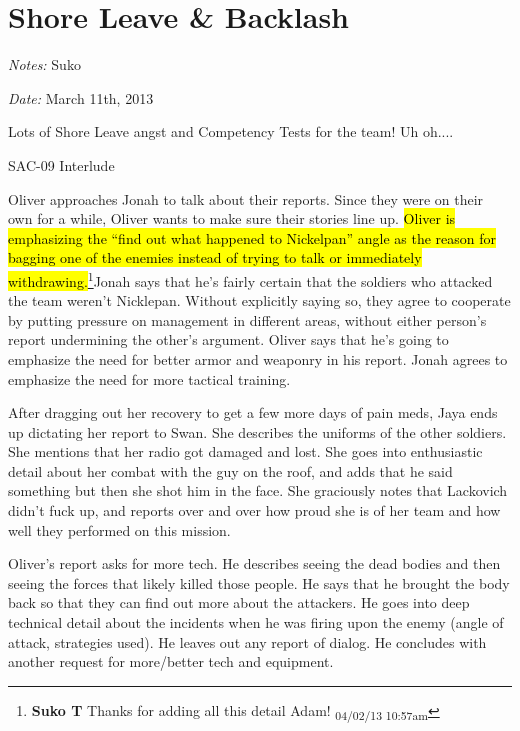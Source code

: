 \setcounter{chapter}{ 16 }
\chapter{\textbf{Shore Leave \& Backlash} }






\textit{Notes:} Suko

\textit{Date:} March 11th, 2013



Lots of Shore Leave angst and Competency Tests for the team!  Uh oh....



\noindent\hrulefill





 {\LARGE SAC-09 Interlude } 



Oliver approaches Jonah to talk about their reports.  Since they were on their own for a while, Oliver wants to make sure their stories line up.  \hl{Oliver is emphasizing the ``find out what happened to Nickelpan'' angle as the reason for bagging one of the enemies instead of trying to talk or immediately withdrawing.}\footnote{\textbf{Suko T }Thanks for adding all this detail Adam! \textsubscript{04/02/13 10:57am}}Jonah says that he's fairly certain that the soldiers who attacked the team weren't Nicklepan.  Without explicitly saying so, they agree to cooperate by putting pressure on management in different areas, without either person's report undermining the other's argument.  Oliver says that he's going to emphasize the need for better armor and weaponry in his report.  Jonah agrees to emphasize the need for more tactical training.



After dragging out her recovery to get a few more days of pain meds, Jaya ends up dictating her report to Swan.  She describes the uniforms of the other soldiers.  She mentions that her radio got damaged and lost.  She goes into enthusiastic detail about her combat with the guy on the roof, and adds that he said something but then she shot him in the face.  She graciously notes that Lackovich didn't fuck up, and reports over and over how proud she is of her team and how well they performed on this mission.



Oliver's report asks for more tech.  He describes seeing the dead bodies and then seeing the forces that likely killed those people.  He says that he brought the body back so that they can find out more about the attackers.  He goes into deep technical detail about the incidents when he was firing upon the enemy (angle of attack, strategies used).  He leaves out any report of dialog. He concludes with another request for more/better tech and equipment.



